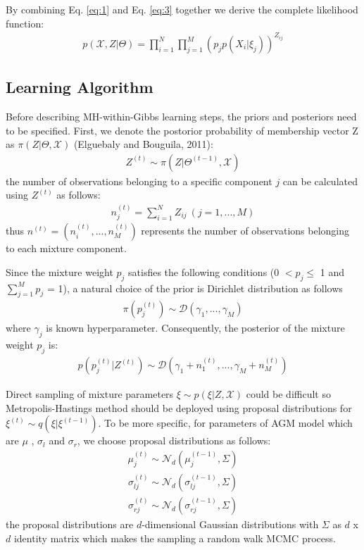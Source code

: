 \documentclass[conference]{llncs}
\begin{document}
By combining Eq. \eqref{eq:1} and Eq. \eqref{eq:3} together we derive the complete likelihood function:
\begin{align}
p(\mathcal{X}, Z|\Theta) = \prod_{i=1}^{N}\prod_{j=1}^{M}(p_jp(X_i|\xi_j))^{Z_{ij}}
\label{eq:4}
\end{align}

\subsection{Learning Algorithm}
Before describing MH-within-Gibbs learning steps, the priors and posteriors need to be specified. First, we denote the postorior probability of membership vector Z as $\pi(Z|\Theta,\mathcal{X})$ (Elguebaly and Bouguila, 2011)\cite{Elguebaly2011}:
\begin{align}
Z^{(t)} \sim \pi(Z|\Theta^{(t-1)},\mathcal{X})
\label{eq:5}
\end{align}
the number of observations belonging to a specific component $j$ can be calculated using $Z^{(t)}$ as follows:
\begin{align}
n_j^{(t)} = \sum_{i=1}^NZ_{ij}\ (j = 1,...,M) 
\label{eq:6}
\end{align}
thus $n^{(t)}=(n_i^{(t)},...,n_M^{(t)})$ represents the number of observations belonging to each mixture component.

Since the mixture weight $p_j$ satisfies the following conditions (0 $< p_j \leq$ 1 and $\sum_{j=1}^Mp_j$ = 1), a natural choice of the prior is Dirichlet distribution as follows \cite{Bouguila2004} \cite{Bouguila2004a} 
\begin{align}
\pi(p_j^{(t)}) \sim \mathcal{D}(\gamma_1,...,\gamma_M )
\label{eq:7}
\end{align}
where $\gamma_j$ is known hyperparameter. Consequently, the posterior of the mixture weight $p_j$ is:
\begin{align}
p(p_j^{(t)}|Z^{(t)}) \sim \mathcal{D}(\gamma_1 + n_1^{(t)},...,\gamma_M + n_M^{(t)})
\label{eq:8}
\end{align}


Direct sampling of mixture parameters $\xi \sim p(\xi|Z,\mathcal{X})$ could be difficult so Metropolis-Hastings method should be deployed using proposal distributions for $\xi^{(t)} \sim q(\xi|\xi^{(t-1)})$. To be more specific, for parameters of AGM model which are $\mu$ , $\sigma_l$ and $\sigma_r$, we choose proposal distributions as follows:
\begin{align}
\mu_j^{(t)} \sim \mathcal{N}_d(\mu_j^{(t-1)},\Sigma)
\label{eq:9}
\end{align}
\begin{align}
\sigma_{lj}^{(t)} \sim \mathcal{N}_d(\sigma_{lj}^{(t-1)},\Sigma)
\label{eq:10}
\end{align}
\begin{align}
\sigma_{rj}^{(t)} \sim \mathcal{N}_d(\sigma_{rj}^{(t-1)},\Sigma)
\label{eq:11}
\end{align}
the proposal distributions are $d$-dimensional Gaussian distributions with $\Sigma$ as $d$ x $d$ identity matrix which makes the sampling a random walk MCMC process.
\end{document}
